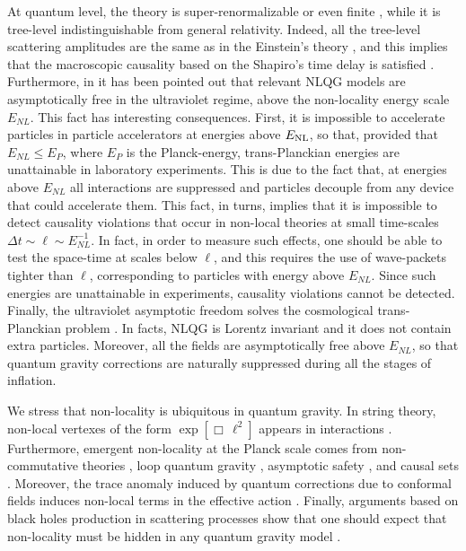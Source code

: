 \documentclass[a4paper,11pt]{article}
\begin{document}
At quantum level, the theory is super-renormalizable or even finite \cite{Modesto,ModestoLeslaw,Review}, while it is tree-level indistinguishable from general relativity. Indeed, all the tree-level scattering amplitudes are the same as in the Einstein's theory \cite{dona}, and this implies that the macroscopic causality based on the Shapiro's time delay is  satisfied \cite{causality}. 
Furthermore, in \cite{transplanck} it has been pointed out that relevant NLQG models are asymptotically free in the ultraviolet regime, above the non-locality energy scale $E_{NL}$. This fact has interesting consequences. First, it is impossible to accelerate particles in particle accelerators at energies above  $E_{\rm NL}$, so that, provided that $E_{NL}\leq E_P$, where $E_P$ is the Planck-energy, trans-Planckian energies are unattainable in laboratory experiments. This is due to the fact that, at energies above $E_{NL}$ all interactions are  suppressed and particles  decouple from any device that could accelerate them. This fact, in turns, implies that it is impossible to detect causality violations that occur in non-local theories at small time-scales $\Delta t \sim \ell \sim E^{-1}_{NL}$. In fact, in order to measure such effects, one should be able to test the space-time at scales below $\ell$, and this requires the use of wave-packets tighter than $\ell$, corresponding to particles with energy above $E_{NL}$. Since such energies are unattainable in experiments, causality violations cannot be detected.
Finally, the ultraviolet asymptotic freedom   solves the  cosmological trans-Planckian problem \cite{TransPlanckianProblem1,TransPlanckianProblem2,TransPlanckianProblem3,TransPlanckianProblem4,TransPlanckianProblem5,TransPlanckianProblem6,TransPlanckianProblem8}.
In facts, NLQG is Lorentz invariant and it does not contain extra particles. Moreover, all the fields are asymptotically free above $E_{NL}$, so that quantum gravity corrections are naturally suppressed during all the stages of inflation. 





We stress that non-locality  is ubiquitous in  quantum  gravity. In string theory, non-local vertexes of the form $\exp[\Box \, \ell^2]$ appears in interactions \cite{string nonlocality1,string nonlocality2,string nonlocality3,string nonlocality4,string nonlocality5,string nonlocality6}. Furthermore, emergent non-locality at the Planck scale comes from  non-commutative theories \cite{amelino,amelino1}, loop quantum gravity \cite{loop}, asymptotic safety
\cite{asymptotic safety}, and causal sets \cite{causal sets}. Moreover, the trace anomaly induced by quantum  corrections due to conformal fields induces non-local terms in the effective action \cite{anomaly1,anomaly2}. Finally, arguments based on black holes production in scattering processes show that one should expect that non-locality must be  hidden in any quantum gravity  model \cite{addazi}.
\end{document}

